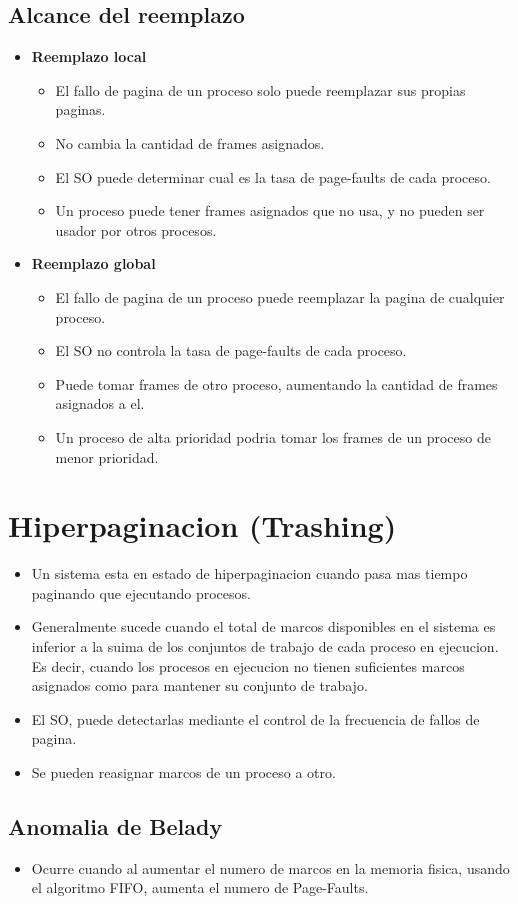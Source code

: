 \documentclass[12pt]{article}
\begin{document}
\subsection{Alcance del reemplazo}
\begin{itemize}
    \item \textbf{Reemplazo local}
        \begin{itemize}
            \item El fallo de pagina de un proceso solo puede reemplazar sus propias paginas.
            \item No cambia la cantidad de frames asignados.
            \item El SO puede determinar cual es la tasa de page-faults de cada proceso.
            \item Un proceso puede tener frames asignados que no usa, y no pueden ser usador por otros procesos.
        \end{itemize}
        \item \textbf{Reemplazo global}
            \begin{itemize}
                \item El fallo de pagina de un proceso puede reemplazar la pagina de cualquier proceso.
                \item El SO no controla la tasa de page-faults de cada proceso.
                \item Puede tomar frames de otro proceso, aumentando la cantidad de frames asignados a el.
                \item Un proceso de alta prioridad podria tomar los frames de un proceso de menor prioridad.
            \end{itemize}
\end{itemize}


\section{Hiperpaginacion (Trashing)}
\begin{itemize}
    \item Un sistema esta en estado de hiperpaginacion cuando pasa mas tiempo paginando que ejecutando procesos.
    \item Generalmente sucede cuando el total de marcos disponibles en el sistema es inferior a la suima de los conjuntos de trabajo de cada proceso en ejecucion. Es decir, cuando los procesos en ejecucion no tienen suficientes marcos asignados como para mantener su conjunto de trabajo.
    \item El SO, puede detectarlas mediante el control de la frecuencia de fallos de pagina.
    \item Se pueden reasignar marcos de un proceso a otro.
\end{itemize}
\subsection{Anomalia de Belady}
\begin{itemize}
    \item Ocurre cuando al aumentar el numero de marcos en la memoria fisica, usando el algoritmo FIFO, aumenta el numero de Page-Faults.
\end{itemize}
\end{document}
